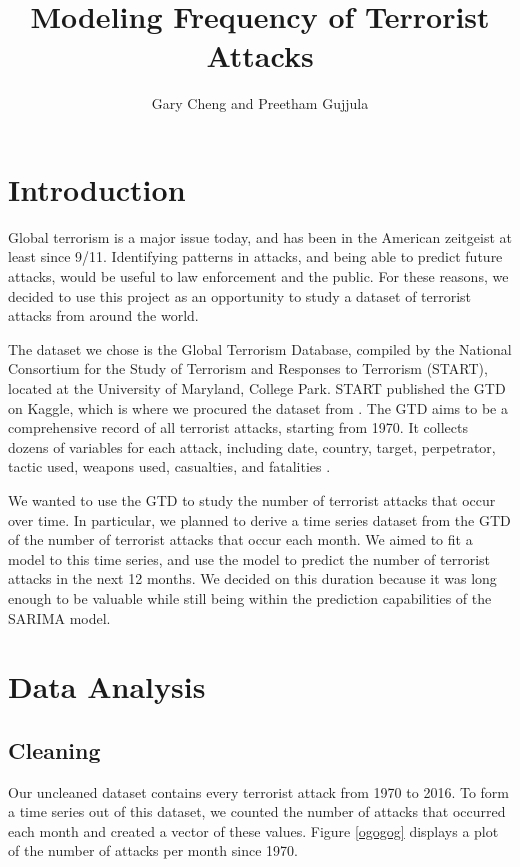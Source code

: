 \documentclass[11pt]{paper}
\title{Modeling Frequency of Terrorist Attacks}
\author{Gary Cheng and Preetham Gujjula}
\begin{document}
\maketitle 

\section{Introduction}
Global terrorism is a major issue today, and has been in the American zeitgeist at least since 9/11. Identifying patterns in attacks, and being able to predict future attacks, would be useful to law enforcement and the public. For these reasons, we decided to use this project as an opportunity to study a dataset of terrorist attacks from around the world.

The dataset we chose is the Global Terrorism Database, compiled by the National Consortium for the Study of Terrorism and Responses to Terrorism (START), located at the University of Maryland, College Park. START published the GTD on Kaggle, which is where we procured the dataset from \cite{kaggle}. The GTD aims to be a comprehensive record of all terrorist attacks, starting from 1970. It collects dozens of variables for each attack, including date, country, target, perpetrator, tactic used, weapons used, casualties, and fatalities \cite{gtdmethodology}.

We wanted to use the GTD to study the number of terrorist attacks that occur over time. In particular, we planned to derive a time series dataset from the GTD of the number of terrorist attacks that occur each month. We aimed to fit a model to this time series, and use the model to predict the number of terrorist attacks in the next 12 months. We decided on this duration because it was long enough to be valuable while still being within the prediction capabilities of the SARIMA model.

\section{Data Analysis}
\subsection{Cleaning}

Our uncleaned dataset contains every terrorist attack from 1970 to 2016. To form a time series out of this dataset, we counted the number of attacks that occurred each month and created a vector of these values. 
Figure \ref{ogogog} displays a plot of the number of attacks per month since 1970.
\end{document}

